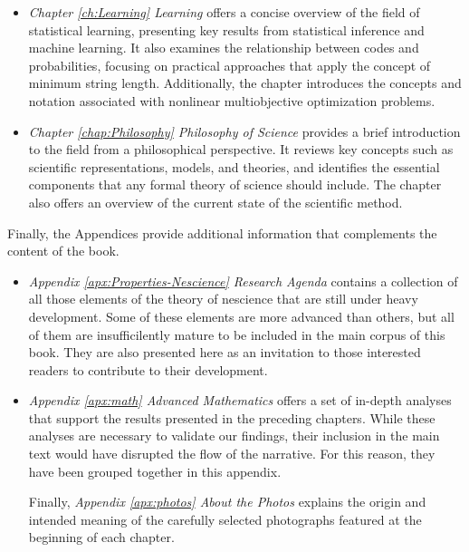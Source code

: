 \begin{itemize}
\item \emph{Chapter \ref{ch:Learning} Learning} offers a concise overview of the field of statistical learning, presenting key results from statistical inference and machine learning. It also examines the relationship between codes and probabilities, focusing on practical approaches that apply the concept of minimum string length. Additionally, the chapter introduces the concepts and notation associated with nonlinear multiobjective optimization problems.

\item \emph{Chapter \ref{chap:Philosophy} Philosophy of Science} provides a brief introduction to the field from a philosophical perspective. It reviews key concepts such as scientific representations, models, and theories, and identifies the essential components that any formal theory of science should include. The chapter also offers an overview of the current state of the scientific method.

\end{itemize}

\bigskip

Finally, the Appendices provide additional information that complements the content of the book.

\begin{itemize}

\item \emph{Appendix \ref{apx:Properties-Nescience} Research Agenda} contains a collection of all those elements of the theory of nescience that are still under heavy development. Some of these elements are more advanced than others, but all of them are insufficilently mature to be included in the main corpus of this book. They are also presented here as an invitation to those interested readers to contribute to their development.

\item \emph{Appendix \ref{apx:math} Advanced Mathematics} offers a set of in-depth analyses that support the results presented in the preceding chapters. While these analyses are necessary to validate our findings, their inclusion in the main text would have disrupted the flow of the narrative. For this reason, they have been grouped together in this appendix.

Finally, \emph{Appendix \ref{apx:photos} About the Photos} explains the origin and intended meaning of the carefully selected photographs featured at the beginning of each chapter.

\end{itemize}


